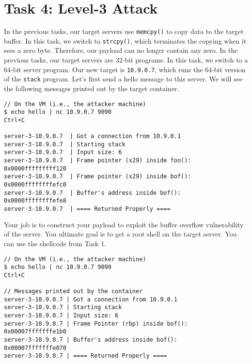 \section{Task 4: Level-3 Attack} 

\ifdefined\arm
In the previous tasks, our target servers use
\texttt{memcpy()} to copy data to the target buffer. In this task,
we switch to \texttt{strcpy()}, which terminates the copying
when it sees a zero byte. Therefore, our payload can 
no longer contain any zero. 
\else
In the previous tasks, our target servers are 32-bit 
programs. In this task, we switch to a 64-bit server 
program.  
\fi
Our new target is \texttt{10.9.0.7}, which 
runs the 64-bit version of the \texttt{stack} program.  
Let's first send a hello message to this server. 
We will see the following messages printed out by the target container. 

\ifdefined\arm
\begin{lstlisting}
// On the VM (i.e., the attacker machine)
$ echo hello | nc 10.9.0.7 9090
Ctrl+C

server-3-10.9.0.7  | Got a connection from 10.9.0.1
server-3-10.9.0.7  | Starting stack
server-3-10.9.0.7  | Input size: 6
server-3-10.9.0.7  | Frame pointer (x29) inside foo():  0x0000fffffffff120
server-3-10.9.0.7  | Frame pointer (x29) inside bof():  0x0000ffffffffefc0
server-3-10.9.0.7  | Buffer's address inside bof():     0x0000ffffffffefe8
server-3-10.9.0.7  | ==== Returned Properly ====
\end{lstlisting}

Your job is to construct your payload to exploit the buffer overflow
vulnerability of the server. 
You ultimate goal is to get a root shell on 
the target server. You can use the shellcode from Task 1. 

\else
\begin{lstlisting}
// On the VM (i.e., the attacker machine)
$ echo hello | nc 10.9.0.7 9090
Ctrl+C

// Messages printed out by the container
server-3-10.9.0.7 | Got a connection from 10.9.0.1
server-3-10.9.0.7 | Starting stack
server-3-10.9.0.7 | Input size: 6
server-3-10.9.0.7 | Frame Pointer (rbp) inside bof():  0x00007fffffffe1b0
server-3-10.9.0.7 | Buffer's address inside bof():     0x00007fffffffe070
server-3-10.9.0.7 | ==== Returned Properly ====
\end{lstlisting}

